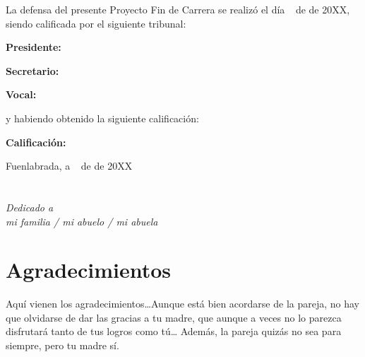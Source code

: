 \documentclass[a4paper, 12pt]{book}
\begin{document}
\vspace{1cm}
La defensa del presente Proyecto Fin de Carrera se realizó el día \qquad$\;\,$ de \qquad\qquad\qquad\qquad \newline de 20XX, siendo calificada por el siguiente tribunal:


\vspace{0.5cm}
\textbf{Presidente:}

\vspace{1.2cm}
\textbf{Secretario:}

\vspace{1.2cm}
\textbf{Vocal:}


\vspace{1.2cm}
y habiendo obtenido la siguiente calificación:

\vspace{1cm}
\textbf{Calificación:}


\vspace{1cm}
\begin{flushright}
Fuenlabrada, a \qquad$\;\,$ de \qquad\qquad\qquad\qquad de 20XX
\end{flushright}


\chapter*{}
\begin{flushright}
\textit{Dedicado a \\
mi familia / mi abuelo / mi abuela}
\end{flushright}


\chapter*{Agradecimientos}

Aquí vienen los agradecimientos\ldots Aunque está bien acordarse de la pareja, no hay que olvidarse de dar las gracias a tu madre, que aunque a veces no lo parezca disfrutará tanto de tus logros como tú\ldots 
Además, la pareja quizás no sea para siempre, pero tu madre sí.
\end{document}
